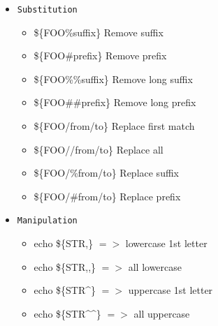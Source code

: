 \begin{frame}[fragile]{\subsubsecname}
  \begin{itemize}
    \item \texttt{Substitution}
    \begin{itemize}
      \item \$\{FOO\%suffix\} 	Remove suffix
      \item \$\{FOO\#prefix\} 	Remove prefix
      \item \$\{FOO\%\%suffix\} 	Remove long suffix
      \item \$\{FOO\#\#prefix\} 	Remove long prefix
      \item \$\{FOO/from/to\} 	Replace first match
      \item \$\{FOO//from/to\} 	Replace all
      \item \$\{FOO/\%from/to\} 	Replace suffix
      \item \$\{FOO/\#from/to\} 	Replace prefix
    \end{itemize}
    \item \texttt{Manipulation}
    \begin{itemize}
      \item echo \$\{STR,\} $=>$ lowercase 1st letter
      \item echo \$\{STR,,\} $=>$ all lowercase
      \item echo \$\{STR\textasciicircum{}\} $=>$ uppercase 1st letter
      \item echo \$\{STR\textasciicircum{}\textasciicircum{}\} $=>$ all uppercase
    \end{itemize}
  \end{itemize}
\end{frame}
